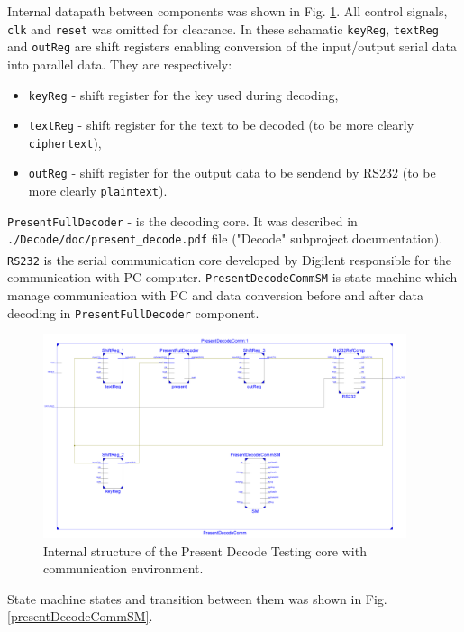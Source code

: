 \documentclass{gajewski}
\begin{document}
Internal datapath between components was shown in Fig. \ref{pdecinside}. All control signals, \texttt{clk} and \texttt{reset} was omitted for clearance. In these schamatic \texttt{keyReg}, \texttt{textReg} and \texttt{outReg} are shift registers enabling conversion of the input/output serial data into parallel data. They are respectively:
\begin{itemize}
    \item \texttt{keyReg} - shift register for the key used during decoding,
    \item \texttt{textReg} - shift register for the text to be decoded (to be more clearly \texttt{ciphertext}),
    \item \texttt{outReg} - shift register for the output data to be sendend by RS232 (to be more clearly \texttt{plaintext}).
\end{itemize}
\texttt{PresentFullDecoder} - is the decoding core. It was described in \texttt{./Decode/doc/present\_decode.pdf} file ("Decode" subproject documentation). \texttt{RS232} is the serial communication core developed by Digilent\textsuperscript{\textregistered} responsible for the communication with PC computer.
\texttt{PresentDecodeCommSM} is state machine which manage communication with PC and data conversion before and after data decoding in \texttt{PresentFullDecoder} component.

\begin{figure}[!ht]%
    \begin{center}
    \includegraphics[width=0.95\textwidth]{img/PresentDecodeCommInside.png}
    \caption{%
        Internal structure of the Present Decode Testing core with communication environment. 
     }%
    \label{pdecinside}
    \end{center}
 \end{figure}

State machine states and transition between them was shown in Fig. \ref{presentDecodeCommSM}.
\end{document}
